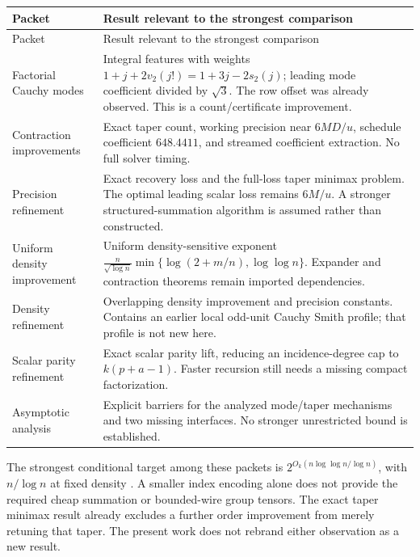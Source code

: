 \documentclass[11pt,letterpaper]{article}
\theoremstyle{remark}\newtheorem{remark}[theorem]{Remark}
\begin{document}
\begin{longtable}{@{}>{\raggedright\arraybackslash}p{}>{\raggedright\arraybackslash}p{}@{}}
\toprule Packet & Result relevant to the strongest comparison\\\midrule\endfirsthead
\toprule Packet & Result relevant to the strongest comparison\\\midrule\endhead
Factorial Cauchy modes \cite{factorial} &
Integral features with weights $1+j+2v_2(j!)=1+3j-2s_2(j)$;
leading mode coefficient divided by $\sqrt3$. The row offset was already
observed. This is a count/certificate improvement.\\[4pt]
Contraction improvements \cite{contraction} &
Exact taper count, working precision near $6MD/u$, schedule coefficient
$648.4411$, and streamed coefficient extraction. No full solver timing.\\[4pt]
Precision refinement \cite{precision} &
Exact recovery loss and the full-loss taper minimax problem. The optimal
leading scalar loss remains $6M/u$. A stronger structured-summation
algorithm is assumed rather than constructed.\\[4pt]
Uniform density improvement \cite{density} &
Uniform density-sensitive exponent
$\frac n{\sqrt{\log n}}\min\{\log(2+m/n),\log\log n\}$.
Expander and contraction theorems remain imported dependencies.\\[4pt]
Density refinement \cite{density2} &
Overlapping density improvement and precision constants. Contains an
earlier local odd-unit Cauchy Smith profile; that profile is not new here.\\[4pt]
Scalar parity refinement \cite{scalar} &
Exact scalar parity lift, reducing an incidence-degree cap to
$k(p+a-1)$. Faster recursion still needs a missing compact factorization.\\[4pt]
Asymptotic analysis \cite{barriers} &
Explicit barriers for the analyzed mode/taper mechanisms and two missing
interfaces. No stronger unrestricted bound is established.\\\bottomrule
\end{longtable}

The strongest conditional target among these packets is
$2^{O_k(n\log\log n/\log n)}$, with $n/\log n$ at fixed density
\cite{precision}. A smaller index encoding alone does not provide the
required cheap summation or bounded-wire group tensors. The exact taper
minimax result already excludes a further order improvement from merely
retuning that taper. The present work does not rebrand either observation
as a new result.
\end{document}
